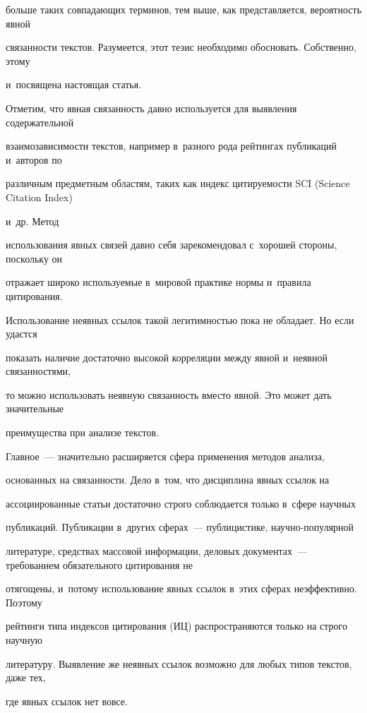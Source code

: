 больше таких совпадающих терминов, тем выше, как представляется, вероятность явной 

связанности текстов. Разумеется, этот тезис необходимо обосновать. Собственно, этому 

и~посвящена настоящая статья. 

     

     Отметим, что явная связанность давно используется для выявления содержательной 

взаимозависимости текстов, например в~разного рода рейтингах публикаций и~авторов по 

различным предметным областям, таких как индекс цитируемости SCI (Science Citation Index)

и~др. Метод 

использования явных связей давно себя зарекомендовал с~хорошей стороны, поскольку он 

отражает широко используемые в~мировой практике нормы и~правила цитирования. 

Использование неявных ссылок такой легитимностью пока не обладает. Но если удастся 

показать наличие достаточно высокой корреляции между явной и~неявной связанностями, 

то можно использовать неявную связанность вместо явной. Это может дать значительные 

преимущества при анализе текстов. 

     

     Главное~--- значительно расширяется сфера применения методов анализа, 

основанных на связанности. Дело в~том, что дисциплина явных ссылок на 

ассоциированные статьи достаточно строго соблюдается только в~сфере научных 

публикаций. Публикации в~других сферах~--- публицистике, на\-уч\-но-по\-пу\-ляр\-ной 

литературе, средствах массовой информации, деловых документах~--- требованием обязательного цитирования не 

отягощены, и~потому использование явных ссылок в~этих сферах неэффективно. Поэтому 

рейтинги типа индексов цитирования (ИЦ) рас\-про\-стра\-ня\-ют\-ся только на строго научную 

литературу. Выявление же неявных ссылок возможно для любых типов текстов, даже тех, 

где явных ссылок нет вовсе. 

